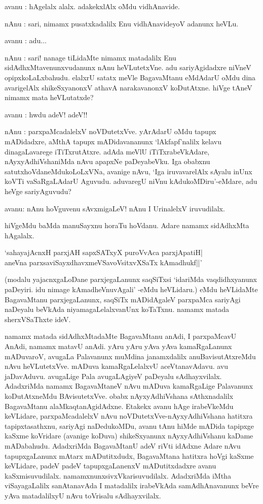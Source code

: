 avanu : hAgelalx alalx. adakekxlAlx oMdu vidhAnavide.

nAnu : sari, nimamx pusatxkadalilx Enu vidhAnavideyoV adanunx heVLu.

avanu : adu$\ldots$ 

nAnu : sari! nanage tiLidaMte nimamx matadalilx Enu sidAdhxMtavenunxvudanunx nAnu heVLutetxVne. adu sariyAgidadxre niVneV opipxkoLaLxbahudu. elalxrU satatx meVle BagavaMtanu eMdAdarU oMdu dina avarigelAlx shikeSxyanonxV athavA narakavanonxV koDutAtxne. hiVge tAneV 
nimamx mata heVLutatxde?

avanu : hwdu adeV! adeV!!

nAnu : parxpaMcadalelxV noVDutetxVve. yArAdarU oMdu tapupx mADidadxre, aMthA tapupx mADidavananunx `lAkfapf'nalilx kelavu dinagaLavarege iTiTxrutAtxre. adAda meVlU iTiTxrabeVkAdare, nAyxyAdhiVshaniMda nAvu apapxNe paDeyabeVku. Iga obabxnu satutxhoVdaneMdukoLoLxVNa, avanige nAvu, `Iga iruvavarelAlx sAyalu inUnx koVTi vaSaRgaLAdarU Aguvudu. aduvaregU niVnu kAdukoMDiru'-eMdare, adu heVge sariyAguvudu?

avanu: nAnu hoVguvenu sAvxmigaLeV! nAnu I UrinalelxV iruvudilalx.

hiVgeMdu baMda manuSayxnu horaTu hoVdanu. Adare namamx sidAdhxMta hAgalalx.

\begin{shloka}
`sahayajAcnxH parxjAH sapxSATxyX puroVvAca parxjApatiH|\\
aneVna parxsaviSayxdhavxmeVSavoV\s sitxvXSaTx kAmadhukf||'
\end{shloka}

(modalu yajacnxgaLoDane parxjegaLanunx saqSiTxsi `idariMda vaqdidhxyanunx paDeyiri. idu nimage kAmadheVnuvAgali' -eMdu heVLidaru.) eMdu heVLidaMte BagavaMtanu parxjegaLanunx, saqSiTx mADidAgaleV parxpaMca sariyAgi naDeyalu beVkAda niyamagaLelalxvanUnx koTaTxnu. 
namamx matada sherxVSaThxte ideV.

namamx matada sidAdhxMtadaMte BagavaMtanu anAdi, I parxpaMcavU AnAdi, namamx matavU anAdi. yAru yAru yAva yAva kamaRgaLanunx mADuvaroV, avugaLa Palavanunx muMdina janamxdalilx anuBavisutAtxreMdu nAvu heVLutetxVve. mADuva kamaRgaLelalxvU aceVtanavAdavu. avu jaDavAduvu. avugaLige Pala avugaLAgiyeV paDeyalu sAdhayxvilalx. AdadxriMda namamx BagavaMtaneV nAvu mADuva kamaRgaLige Palavanunx koDutAtxneMdu BAvisutetxVve. obabx nAyxyAdhiVshana sAthxnadalilx BagavaMtanu alaMkaqtanAgidAdxne. Etakekx avanu hAge irabeVkeMdu 
keVLidare, parxpaMcadalelxV nAvu noVDutetxVve-nAyxyAdhiVshana hatitxra tapipxtasathxnu, sariyAgi naDedukoMDu, avanu tAnu hiMde mADida tapipxge kaSxme koVridare (avanige koDuva) shikeSxyanunx nAyxyAdhiVshanu kaDame mADabahudu. AdadxriMda BagavaMtanU adeV riVti idAdxne Adare nAvu tapupxgaLanunx mAtarx mADutitxdudx, BagavaMtana hatitxra hoVgi kaSxme keVLidare, padeV padeV tapupxgaLanenxV mADutitxdadxre avanu kaSxmisuvudilalx. namamxnunxsivxVkarisuvudilalx. AdadxriMda iMtha viSayagaLalilx sanAtanavAda I matadalilx 
irabeVkAda samAdhAnavanunx beVre yAva matadalilxyU nAvu toVrisalu sAdhayxvilalx.

